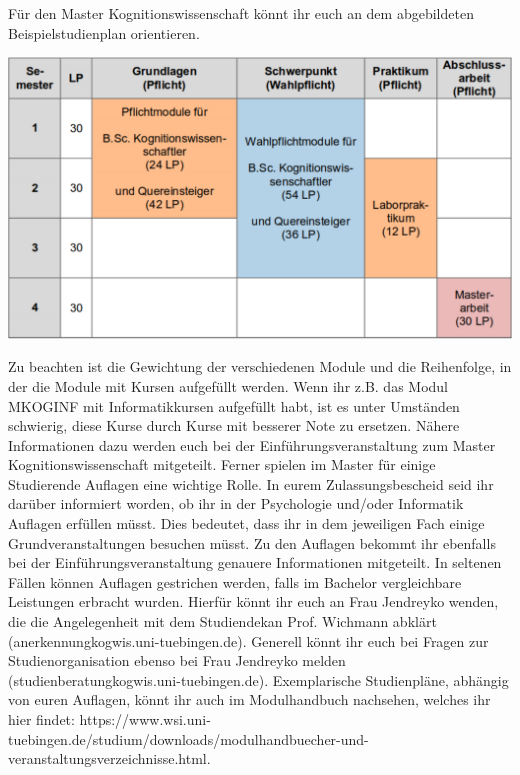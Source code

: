 \ifkogwiss
Für den Master Kognitionswissenschaft könnt ihr euch an dem abgebildeten Beispielstudienplan orientieren.
\begin{center}
	\includegraphics[width=.8\textwidth]{media/studienplan_kmsc.pdf}
\end{center}
Zu beachten ist die Gewichtung der verschiedenen Module und die Reihenfolge, in der die Module mit Kursen aufgefüllt werden. Wenn
ihr z.B. das Modul MKOGINF mit Informatikkursen aufgefüllt habt, ist es unter Umständen schwierig, diese Kurse durch Kurse mit
besserer Note zu ersetzen. Nähere Informationen dazu werden euch bei der Einführungsveranstaltung zum Master Kognitionswissenschaft mitgeteilt. Ferner spielen im Master für einige Studierende Auflagen eine wichtige Rolle. In eurem Zulassungsbescheid seid ihr darüber informiert worden, ob ihr in der Psychologie und/oder Informatik Auflagen erfüllen müsst. Dies bedeutet, dass ihr in dem jeweiligen Fach einige Grundveranstaltungen besuchen müsst. Zu den Auflagen bekommt ihr ebenfalls bei der Einführungsveranstaltung genauere Informationen mitgeteilt. In seltenen Fällen können Auflagen gestrichen werden, falls im Bachelor vergleichbare Leistungen erbracht wurden. Hierfür könnt ihr euch an Frau Jendreyko wenden, die die Angelegenheit mit dem Studiendekan Prof. Wichmann abklärt (anerkennung\At kogwis.uni-tuebingen.de). Generell könnt ihr euch bei Fragen zur Studienorganisation ebenso bei Frau Jendreyko melden (studienberatung\At kogwis.uni-tuebingen.de). Exemplarische Studienpläne, abhängig von euren Auflagen, könnt ihr auch im Modulhandbuch nachsehen, welches ihr hier findet: https://www.wsi.uni-tuebingen.de/studium/downloads/modulhandbuecher-und-veranstaltungsverzeichnisse.html.

